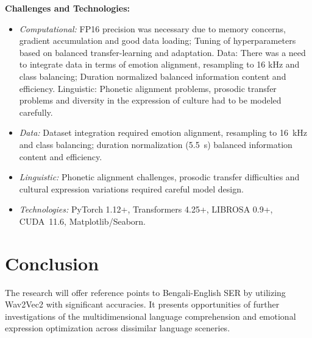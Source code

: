 \documentclass[conference]{IEEEtran}
\begin{document}
\noindent\textbf{Challenges and Technologies:}
\begin{itemize}
  \item \textit{Computational:} FP16 precision was necessary due to memory concerns, gradient accumulation and good data loading; Tuning of hyperparameters based on balanced transfer-learning and adaptation.
Data: There was a need to integrate data in terms of emotion alignment, resampling to 16 kHz and class balancing; Duration normalized balanced information content and efficiency.
Linguistic: Phonetic alignment problems, prosodic transfer problems and diversity in the expression of culture had to be modeled carefully.

  \item \textit{Data:} Dataset integration required emotion alignment, resampling to 16~kHz
        and class balancing; duration normalization (5.5~s) balanced information content and
        efficiency.
  \item \textit{Linguistic:} Phonetic alignment challenges, prosodic transfer difficulties and
        cultural expression variations required careful model design.
  \item \textit{Technologies:} PyTorch 1.12+, Transformers 4.25+, LIBROSA 0.9+,
        CUDA~11.6, Matplotlib/Seaborn.
\end{itemize}

\section*{Conclusion}

The research will offer reference points to Bengali-English SER by utilizing Wav2Vec2 with significant accuracies. It presents opportunities of further investigations of the multidimensional language comprehension and emotional expression optimization across
dissimilar language sceneries.
\end{document}
